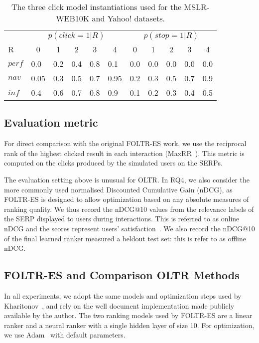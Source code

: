 \newcommand{\tc}[1]{\multicolumn{1}{c}{#1}}
\setlength{\tabcolsep}{3mm}

\begin{table}[t!]
	\centering
	\caption[centre]{The three click model instantiations used for the MSLR-WEB10K and Yahoo! datasets.}\label{mslr-CCM}
	\begin{tabularx}{\textwidth}{XXXXXXXXXXX}
		\toprule
		& \multicolumn{5}{c}{$p(click=1|R)$} & \multicolumn{5}{c}{$p(stop=1|R)$} \\
		\cmidrule(r){2-6}  \cmidrule(){7-11}
		R & \tc{0}& \tc{1} &\tc{2} & \tc{3}& \tc{4}&  \tc{0} & \tc{1} & \tc{2} & \tc{3} & \tc{4} \\
		\midrule
		$perf$ & 0.0 & 0.2 & 0.4 & 0.8 & 0.1& 0.0 & 0.0 & 0.0 & 0.0 & 0.0\\
		$nav$ & 0.05 & 0.3 & 0.5 & 0.7 & 0.95& 0.2 & 0.3 & 0.5 & 0.7 & 0.9\\
		$inf$ & 0.4 & 0.6 & 0.7 & 0.8 & 0.9& 0.1 & 0.2 & 0.3 & 0.4 & 0.5\\
		\bottomrule
	\end{tabularx}
	\vspace{-10pt}
\end{table}

\subsection{Evaluation metric}
For direct comparison with the original FOLTR-ES work, we use the reciprocal rank of the highest clicked result in each interaction (MaxRR~\cite{radlinski2008learning}). This metric is computed on the clicks produced by the simulated users on the SERPs. 

The evaluation setting above is unusual for OLTR. In RQ4, we also consider the more commonly used normalised Discounted Cumulative Gain (nDCG), as FOLTR-ES is designed to allow optimization based on any absolute measures of ranking quality. We thus record the nDCG@10 values from the relevance labels of the SERP displayed to users during interactions. This is referred to as online nDCG and the scores represent users' satisfaction~\cite{DBLP:conf/wsdm/HofmannSWR13}. We also record the nDCG@10 of the final learned ranker measured a heldout test set: this is refer to as offline nDCG.


\subsection{FOLTR-ES and Comparison OLTR Methods}
In all experiments, we adopt the same models and optimization steps used by Kharitonov~\cite{kharitonov2019federated}, and rely on the well document implementation made publicly available by the author. The two ranking models used by FOLTR-ES are a linear ranker and a neural ranker with a single hidden layer of size 10. For optimization, we use Adam~\cite{kingma2014adam} with default parameters.



